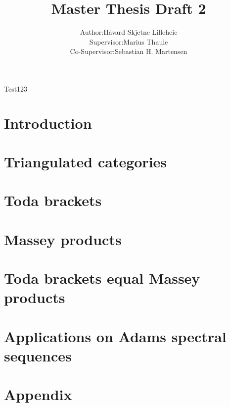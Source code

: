 \documentclass[a4paper, 12pt]{article}
\title{Master Thesis Draft 2}
\author{
    \begin{tabular}{rl}
        Author:& Håvard Skjetne Lilleheie\\
        Supervisor:& Marius Thaule\\
        Co-Supervisor:& Sebastian H. Martensen
    \end{tabular}
}
\begin{document}
\maketitle

\tableofcontents

Test123 \cite[test]{Jasso-Muro_2023}

\section{Introduction}


\section{Triangulated categories}


\section{Toda brackets}


\section{Massey products}


\section{Toda brackets equal Massey products}


\section{Applications on Adams spectral sequences}


\appendix
\section{Appendix}


{}

\end{document}
